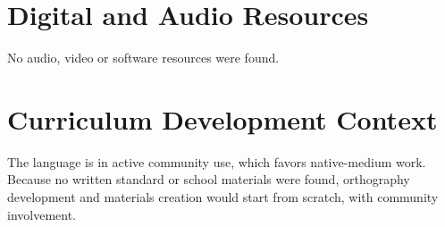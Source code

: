 \documentclass[12pt]{article}
\begin{document}
\section{Digital and Audio Resources}
No audio, video or software resources were found.

\section{Curriculum Development Context}
The language is in active community use, which favors native-medium work. Because no written standard or school materials were found, orthography development and materials creation would start from scratch, with community involvement.
\end{document}
